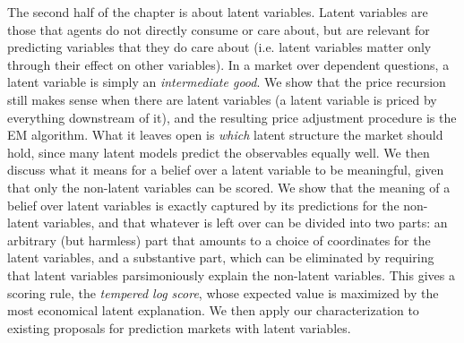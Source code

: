 \begin{draftblock}
The second half of the chapter is about latent variables. Latent variables are those that agents do not directly consume or care about, but are relevant for predicting variables that they do care about (i.e. latent variables matter only through their effect on other variables). In a market over dependent questions, a latent variable is simply an \emph{intermediate good}. We show that the price recursion still makes sense when there are latent variables (a latent variable is priced by everything downstream of it), and the resulting price adjustment procedure is the EM algorithm. What it leaves open is \emph{which} latent structure the market should hold, since many latent models predict the observables equally well. We then discuss what it means for a belief over a latent variable to be meaningful, given that only the non-latent variables can be scored. We show that the meaning of a belief over latent variables is exactly captured by its predictions for the non-latent variables, and that whatever is left over can be divided into two parts: an arbitrary (but harmless) part that amounts to a choice of coordinates for the latent variables, and a substantive part, which can be eliminated by requiring that latent variables parsimoniously explain the non-latent variables. This gives a scoring rule, the \emph{tempered log score}, whose expected value is maximized by the most economical latent explanation. We then apply our characterization to existing proposals for prediction markets with latent variables.


\end{draftblock}
